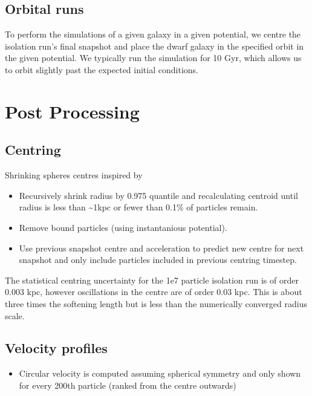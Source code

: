 \subsection{Orbital runs}\label{orbital-runs}

To perform the simulations of a given galaxy in a given potential, we
centre the isolation run's final snapshot and place the dwarf galaxy in
the specified orbit in the given potential. We typically run the
simulation for 10 Gyr, which allows us to orbit slightly past the
expected initial conditions.

\section{Post Processing}\label{post-processing}

\subsection{Centring}\label{centring}

Shrinking spheres centres inspired by \citet{power+2003}

\begin{itemize}
\tightlist
\item
  Recursively shrink radius by 0.975 quantile and recalculating centroid
  until radius is less than \textasciitilde1kpc or fewer than 0.1\% of
  particles remain.
\item
  Remove bound particles (using instantanious potential).
\item
  Use previous snapshot centre and acceleration to predict new centre
  for next snapshot and only include particles included in previous
  centring timestep.
\end{itemize}

The statistical centring uncertainty for the 1e7 particle isolation run
is of order 0.003 kpc, however oscillations in the centre are of order
0.03 kpc. This is about three times the softening length but is less
than the numerically converged radius scale.

\subsection{Velocity profiles}\label{velocity-profiles}

\begin{itemize}
\tightlist
\item
  Circular velocity is computed assuming spherical symmetry and only
  shown for every 200th particle (ranked from the centre outwards)
\end{itemize}


